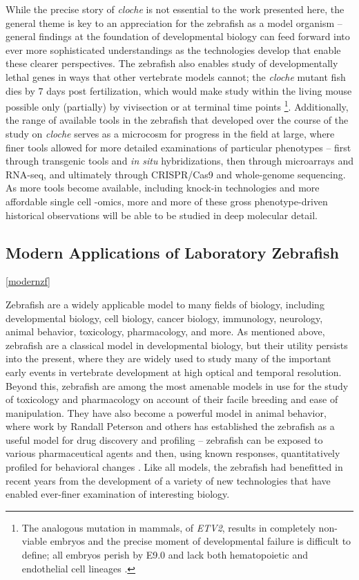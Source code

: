While the precise story of \textit{cloche} is not essential to the work presented here, the general theme is key to an appreciation for the zebrafish as a model organism -- general findings at the foundation of developmental biology can feed forward into ever more sophisticated understandings as the technologies develop that enable these clearer perspectives. The zebrafish also enables study of developmentally lethal genes in ways that other vertebrate models cannot; the \textit{cloche} mutant fish dies by 7 days post fertilization, which would make study within the living mouse possible only (partially) by vivisection or at terminal time points \footnote{The analogous mutation in mammals, of \textit{ETV2}, results in completely non-viable embryos and the precise moment of developmental failure is difficult to define; all embryos perish by E9.0 and lack both hematopoietic and endothelial cell lineages \citep{Garry2016}.}. Additionally, the range of available tools in the zebrafish that developed over the course of the study on \textit{cloche} serves as a microcosm for progress in the field at large, where finer tools allowed for more detailed examinations of particular phenotypes -- first through transgenic tools and \textit{in situ} hybridizations, then through microarrays and RNA-seq, and ultimately through CRISPR/Cas9 and whole-genome sequencing. As more tools become available, including knock-in technologies and more affordable single cell -omics, more and more of these gross phenotype-driven historical observations will be able to be studied in deep molecular detail. 

\subsection{Modern Applications of Laboratory Zebrafish}\autoref{modernzf}

Zebrafish are a widely applicable model to many fields of biology, including developmental biology, cell biology, cancer biology, immunology, neurology, animal behavior, toxicology, pharmacology, and more. As mentioned above, zebrafish are a classical model in developmental biology, but their utility persists into the present, where they are widely used to study many of the important early events in vertebrate development at high optical and temporal resolution. Beyond this, zebrafish are among the most amenable models in use for the study of toxicology and pharmacology on account of their facile breeding and ease of manipulation. They have also become a powerful model in animal behavior, where work by Randall Peterson and others has established the zebrafish as a useful model for drug discovery and profiling -- zebrafish can be exposed to various pharmaceutical agents and then, using known responses, quantitatively profiled for behavioral changes \citep{MacRae2003, MacRae2015, Peterson2012, Rihel2010, Kokel2010, Kokel2011, Bruni2016, Zon2005, Patton2021}. Like all models, the zebrafish had benefitted in recent years from the development of a variety of new technologies that have enabled ever-finer examination of interesting biology.

